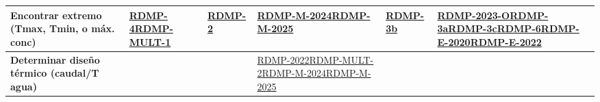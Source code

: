 \begin{table}[H]
{\begin{tabular}{|p{4.5cm}|p{2.5cm}|p{2cm}|p{2.5cm}|p{2.5cm}|p{3.5cm}|}
            \hline
            \textbf{Encontrar extremo (Tmax, Tmin, o máx. conc)}                                                                                                                                            &
            \hyperlink{qs:RDMP-4}{RDMP-4}\newline \hyperlink{qs:RDMP-MULT-1}{RDMP-MULT-1}                                                                                                                   &
            \hyperlink{qs:RDMP-2}{RDMP-2}                                                                                                                                                                   &
            \hyperlink{qs:RDMP-MULTI-2024-0}{RDMP-M-2024}\newline \hyperlink{qs:RDMP-MULTI-2025-O}{RDMP-M-2025}                                                                                             &
            \hyperlink{qs:RDMP-3b}{RDMP-3b}                                                                                                                                                                 &
            \hyperlink{qs:RDMP-2023-O}{RDMP-2023-O}\newline \hyperlink{qs:RDMP-3a}{RDMP-3a}\newline \hyperlink{qs:RDMP-3c}{RDMP-3c}\newline \hyperlink{qs:RDMP-6}{RDMP-6}\newline \hyperlink{qs:RDMP-E-2020}{RDMP-E-2020}\newline \hyperlink{qs:RDMP-E-2022}{RDMP-E-2022}                                                                                         \\
            \hline
            \textbf{Determinar diseño térmico (caudal/T agua)}                                                                                                                                              &
                                                                                                                                                                                                            &
                                                                                                                                                                                                            &
            \hyperlink{qs:RDMP-2022}{RDMP-2022}\newline \hyperlink{qs:RDMP-MULT-2}{RDMP-MULT-2}\newline \hyperlink{qs:RDMP-MULTI-2024-0}{RDMP-M-2024}\newline \hyperlink{qs:RDMP-MULTI-2025-O}{RDMP-M-2025} &

\end{tabular}}
\end{table}
